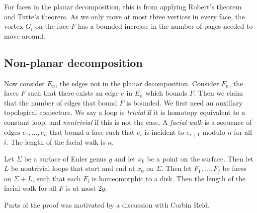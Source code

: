 For faces in the planar decomposition, this is from applying Robert's theorem and Tutte's theorem. As we only move at most three vertices in every face, the vortex $G_i$ on the face $F$ has a bounded increase in the number of pages needed to move around. 

\subsection{Non-planar decomposition}
Now consider $E_n$, the edges not in the planar decomposition. Consider $F_n$, the faces $F$ such that there exists an edge $e$ in $E_n$ which bounds $F$. Then we claim that the number of edges that bound $F$ is bounded. We first need an auxillary topological conjecture. We say a loop is \textit{trivial} if it is homotopy equivalent to a constant loop, and \textit{nontrivial} if this is not the case. A \textit{facial walk} is a sequence of edges $e_1, ..., e_n$ that bound a face such that $e_i$ is incident to $e_{i + 1}$ modulo $n$ for all $i$. The length of the facial walk is $n$. 

\begin{lemma}
	Let $\Sigma$ be a surface of Euler genus $g$ and let $x_0$ be a point on the surface. Then let $L$ be nontrivial loops that start and end at $x_0$ on $\Sigma$. Then let $F_1, ..., F_j$ be faces on $\Sigma + L$, such that each $F_i$ is homeomorphic to a disk. Then the length of the facial walk for all $F$ is at most $2g$. 
\end{lemma}

Parts of the proof was motivated by a discussion with Corbin Reid. 

